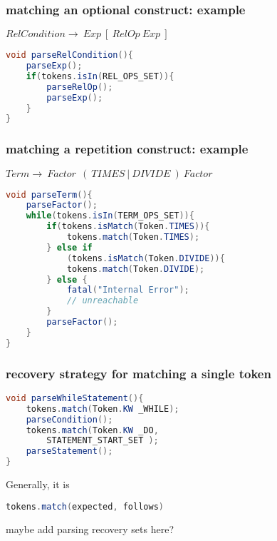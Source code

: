 \subsubsection{matching an optional construct: example}
\begin{scriptsize}
$RelCondition \rightarrow \ Exp \ [ \ RelOp \ Exp \ ]$
\begin{lstlisting}[language=Java]
void parseRelCondition(){
    parseExp();
    if(tokens.isIn(REL_OPS_SET)){
        parseRelOp();
        parseExp();
    }
}
\end{lstlisting}
\end{scriptsize}

\subsubsection{matching a repetition construct: example}
\begin{scriptsize}
$Term \rightarrow \ Factor \ { \ ( \ TIMES \ | \ DIVIDE \ ) \ Factor \ }$
\begin{lstlisting}[language=Java]
void parseTerm(){
    parseFactor();
    while(tokens.isIn(TERM_OPS_SET)){
        if(tokens.isMatch(Token.TIMES)){
            tokens.match(Token.TIMES);
        } else if 
            (tokens.isMatch(Token.DIVIDE)){
            tokens.match(Token.DIVIDE);
        } else {
            fatal("Internal Error");
            // unreachable
        }
        parseFactor();
    }
}
\end{lstlisting}
\end{scriptsize}

\subsubsection{recovery strategy for matching a single token}
\begin{scriptsize}
\begin{lstlisting}[language=Java, emph={STATEMENT_START_SET}, emphstyle=\textbf]
void parseWhileStatement(){
    tokens.match(Token.KW _WHILE);
    parseCondition();
    tokens.match(Token.KW _DO, 
        STATEMENT_START_SET );
    parseStatement();
}
\end{lstlisting}
\end{scriptsize}

Generally, it is  
\begin{lstlisting}[language=Java]
tokens.match(expected, follows)
\end{lstlisting}

maybe add parsing recovery sets here?

